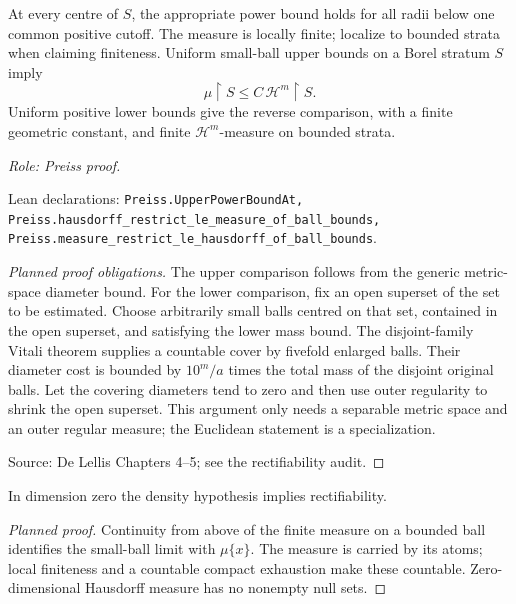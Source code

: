 \begin{lemma}
\label{lem:density-measure-comparison}








At every centre of \(S\), the appropriate power bound holds for all radii below one common positive cutoff. The measure is locally finite; localize to bounded strata when claiming finiteness.
Uniform small-ball upper bounds on a Borel stratum \(S\) imply
\[
 \mu\!\restriction S\leq C\,\mathcal H^m\!\restriction S.
\]
Uniform positive lower bounds give the reverse comparison, with a finite geometric constant, and finite \(\mathcal H^m\)-measure on bounded strata.
\par\emph{Role: Preiss proof.}
\par Lean declarations: \texttt{Preiss.UpperPowerBoundAt, Preiss.hausdorff\_restrict\_le\_measure\_of\_ball\_bounds, Preiss.measure\_restrict\_le\_hausdorff\_of\_ball\_bounds}.
\end{lemma}
\begin{proof}[Planned proof obligations]

The upper comparison follows from the generic metric-space diameter bound.
For the lower comparison, fix an open superset of the set to be estimated.
Choose arbitrarily small balls centred on that set, contained in the open
superset, and satisfying the lower mass bound. The disjoint-family Vitali
theorem supplies a countable cover by fivefold enlarged balls. Their diameter
cost is bounded by $10^m/a$ times the total mass of the disjoint original balls.
Let the covering diameters tend to zero and then use outer regularity to
shrink the open superset. This argument only needs a separable metric space
and an outer regular measure; the Euclidean statement is a specialization.
\par Source: De Lellis Chapters 4--5; see the rectifiability audit.
\end{proof}

\begin{lemma}
\label{lem:zero-dimension}










In dimension zero the density hypothesis implies rectifiability.
\end{lemma}
\begin{proof}[Planned proof]
Continuity from above of the finite measure on a bounded ball identifies
the small-ball limit with $\mu\{x\}$. The measure is carried by its atoms;
local finiteness and a countable compact exhaustion make these countable.
Zero-dimensional Hausdorff measure has no nonempty null sets.
\end{proof}

